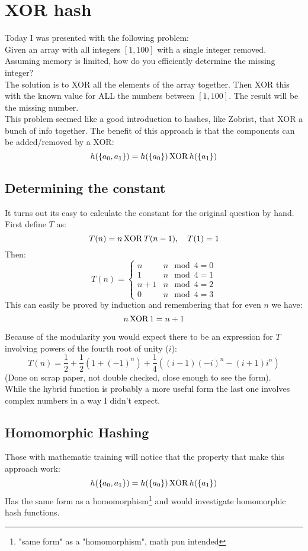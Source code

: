 
\section{XOR hash}
Today I was presented with the following problem:
\\

Given an array with all integers $[1,100]$ with a single integer removed.
Assuming memory is limited, how do you efficiently determine the missing integer?
\\

The solution is to XOR all the elements of the array together.
Then XOR this with the known value for ALL the numbers between $[1,100]$.
The result will be the missing number.
\\

This problem seemed like a good introduction to hashes, like Zobrist, that XOR a bunch of info together.
The benefit of this approach is that the components can be added/removed by a XOR:
\[h(\{a_0,a_1\}) = h(\{a_0\})\operatorname{XOR} h(\{a_1\})\]

\subsection{Determining the constant}
It turns out its easy to calculate the constant for the original question by hand.
First define $T$ as:
\[T(n) = n \operatorname{XOR} T(n-1),\quad T(1) = 1\]
Then:
\[T(n) = \begin{cases}n&n \mod 4 = 0 \\1& n\mod 4 = 1\\ n+1 &n\mod 4 = 2\\ 0& n\mod 4 = 3\end{cases}\]
This can easily be proved by induction and remembering that for even $n$ we have:
\[n\operatorname{XOR} 1 = n+1\]

Because of the modularity you would expect there to be an expression for $T$ involving powers of the fourth root of unity ($i$): 
\[T(n) = \frac{1}{2} +\frac{1}{2}(1+(-1)^n)+\frac{1}{4}((i-1)(-i)^n-(i+1)i^n)\]
(Done on scrap paper, not double checked, close enough to see the form).
\\

While the hybrid function is probably a more useful form the last one involves complex numbers in a way I didn't expect.

\subsection{Homomorphic Hashing}
Those with mathematic training will notice that the property that make this approach work:
\[h(\{a_0,a_1\}) = h(\{a_0\})\operatorname{XOR} h(\{a_1\})\]
Has the same form as a homomorphism\footnote{"same form" as a "homomorphism", math pun intended} and would investigate homomorphic hash functions. 

